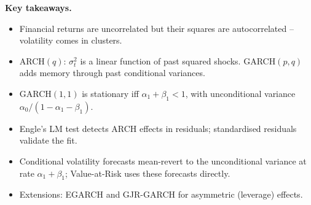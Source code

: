 \noindent\textbf{Key takeaways.}
\begin{itemize}
  \item Financial returns are uncorrelated but their squares are
        autocorrelated -- volatility comes in clusters.
  \item ARCH$(q)$: $\sigma_t^2$ is a linear function of past
        squared shocks. GARCH$(p, q)$ adds memory through past
        conditional variances.
  \item GARCH$(1, 1)$ is stationary iff $\alpha_1 + \beta_1 < 1$,
        with unconditional variance
        $\alpha_0 / (1 - \alpha_1 - \beta_1)$.
  \item Engle's LM test detects ARCH effects in residuals;
        standardised residuals validate the fit.
  \item Conditional volatility forecasts mean-revert to the
        unconditional variance at rate $\alpha_1 + \beta_1$;
        Value-at-Risk uses these forecasts directly.
  \item Extensions: EGARCH and GJR-GARCH for asymmetric (leverage)
        effects.
\end{itemize}
